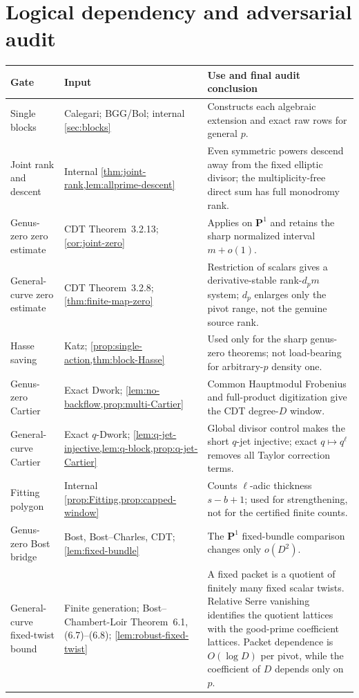 \documentclass[11pt]{article}
\theoremstyle{definition}
\theoremstyle{remark}
\begin{document}
\section{Logical dependency and adversarial audit}\label{sec:audit}

\begingroup\small
\begin{longtable}{@{}>{\raggedright\arraybackslash}p{}>{\raggedright\arraybackslash}p{}>{\raggedright\arraybackslash}p{}@{}}
\toprule
Gate&Input&Use and final audit conclusion\\
\midrule
Single blocks&Calegari; BGG/Bol; internal \cref{sec:blocks}&Constructs each algebraic extension and exact raw rows for general $p$.\\
Joint rank and descent&Internal \cref{thm:joint-rank,lem:allprime-descent}&Even symmetric powers descend away from the fixed elliptic divisor; the multiplicity-free direct sum has full monodromy rank.\\
Genus-zero zero estimate&CDT Theorem~3.2.13; \cref{cor:joint-zero}&Applies on $\mathbf P^1$ and retains the sharp normalized interval $m+o(1)$.\\
General-curve zero estimate&CDT Theorem~3.2.8; \cref{thm:finite-map-zero}&Restriction of scalars gives a derivative-stable rank-$d_pm$ system; $d_p$ enlarges only the pivot range, not the genuine source rank.\\
Hasse saving&Katz; \cref{prop:single-action,thm:block-Hasse}&Used only for the sharp genus-zero theorems; not load-bearing for arbitrary-$p$ density one.\\
Genus-zero Cartier&Exact Dwork; \cref{lem:no-backflow,prop:multi-Cartier}&Common Hauptmodul Frobenius and full-product digitization give the CDT degree-$D$ window.\\
General-curve Cartier&Exact $q$-Dwork; \cref{lem:q-jet-injective,lem:q-block,prop:q-jet-Cartier}&Global divisor control makes the short $q$-jet injective; exact $q\mapsto q^\ell$ removes all Taylor correction terms.\\
Fitting polygon&Internal \cref{prop:Fitting,prop:capped-window}&Counts $\ell$-adic thickness $s-b+1$; used for strengthening, not for the certified finite counts.\\
Genus-zero Bost bridge&Bost, Bost--Charles, CDT; \cref{lem:fixed-bundle}&The $\mathbf P^1$ fixed-bundle comparison changes only $o(D^2)$.\\
General-curve fixed-twist bound&Finite generation; Bost--Chambert-Loir Theorem~6.1, (6.7)--(6.8); \cref{lem:robust-fixed-twist}&A fixed packet is a quotient of finitely many fixed scalar twists.  Relative Serre vanishing identifies the quotient lattices with the good-prime coefficient lattices.  Packet dependence is $O(\log D)$ per pivot, while the coefficient of $D$ depends only on $p$.\\

\end{longtable}
\end{document}
